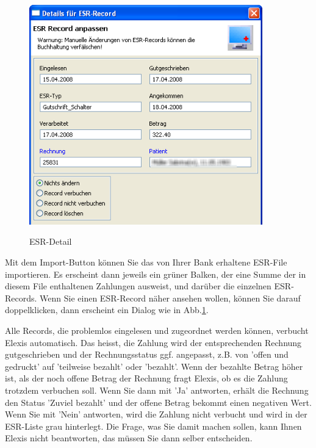 \documentclass[a4paper]{scrartcl}
\begin{document}
\begin{figure}
  \includegraphics[width=0.9\textwidth]{abr21}\\
  \caption{ESR-Detail}\label{fig:abr21}
\end{figure}

Mit dem Import-Button können Sie das von Ihrer Bank erhaltene ESR-File importieren. Es erscheint dann jeweils ein grüner Balken, der eine Summe der in diesem File enthaltenen Zahlungen ausweist, und darüber die einzelnen ESR-Records. Wenn Sie einen ESR-Record näher ansehen wollen, können Sie darauf doppelklicken, dann erscheint ein Dialog wie in Abb.\ref{fig:abr21}.

\medskip

Alle Records, die problemlos eingelesen und zugeordnet werden können, verbucht Elexis automatisch. Das heisst, die Zahlung wird der entsprechenden Rechnung gutgeschrieben und der Rechnungsstatus ggf. angepasst, z.B. von 'offen und gedruckt' auf 'teilweise bezahlt' oder 'bezahlt'. Wenn der bezahlte Betrag höher ist, als der noch offene Betrag der Rechnung fragt Elexis, ob es die Zahlung trotzdem verbuchen soll. Wenn Sie dann mit 'Ja' antworten, erhält die Rechnung den Status 'Zuviel bezahlt' und der offene Betrag bekommt einen negativen Wert. Wenn Sie mit 'Nein' antworten, wird die Zahlung nicht verbucht und wird in der ESR-Liste grau hinterlegt. Die Frage, was Sie damit machen sollen, kann Ihnen Elexis nicht beantworten, das müssen Sie dann selber entscheiden.
\end{document}
